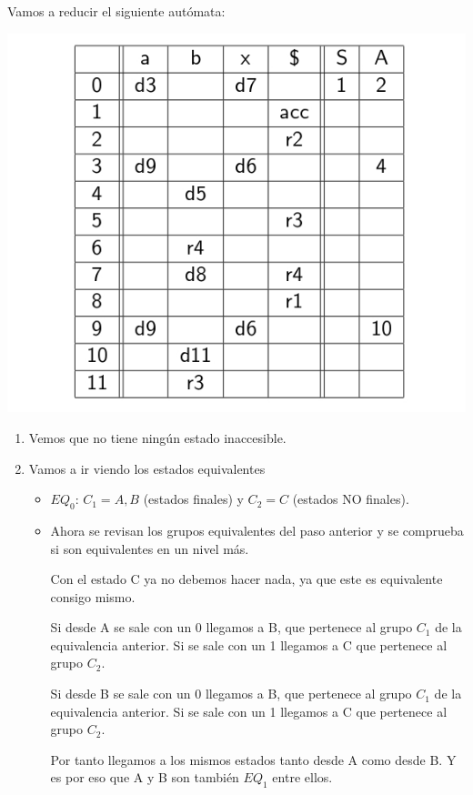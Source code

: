 \documentclass{apuntes}
\begin{document}
\begin{example}
Vamos a reducir el siguiente autómata:

\begin{center}
\includegraphics[scale=0.4]{img/tablaanalisislr1.jpg}
\end{center}

\begin{enumerate}
\item Vemos que no tiene ningún estado inaccesible.
\item Vamos a ir viendo los estados equivalentes
\begin{itemize}
\item $EQ_0$: $C_1={A,B}$ (estados finales) y $C_2={C}$ (estados NO finales).
\item Ahora se revisan los grupos equivalentes del paso anterior y se comprueba si son equivalentes en un nivel más.

Con el estado C ya no debemos hacer nada, ya que este es equivalente consigo mismo.

Si desde A se sale con un 0 llegamos a B, que pertenece al grupo $C_1$ de la equivalencia anterior. Si se sale con un 1 llegamos a C que pertenece al grupo $C_2$.

Si desde B se sale con un 0 llegamos a B, que pertenece al grupo $C_1$ de la equivalencia anterior. Si se sale con un 1 llegamos a C que pertenece al grupo $C_2$.

Por tanto llegamos a los mismos estados tanto desde A como desde B. Y es por eso que A y B son también $EQ_1$ entre ellos. 


\end{itemize}
\end{enumerate}
\end{example}
\end{document}
